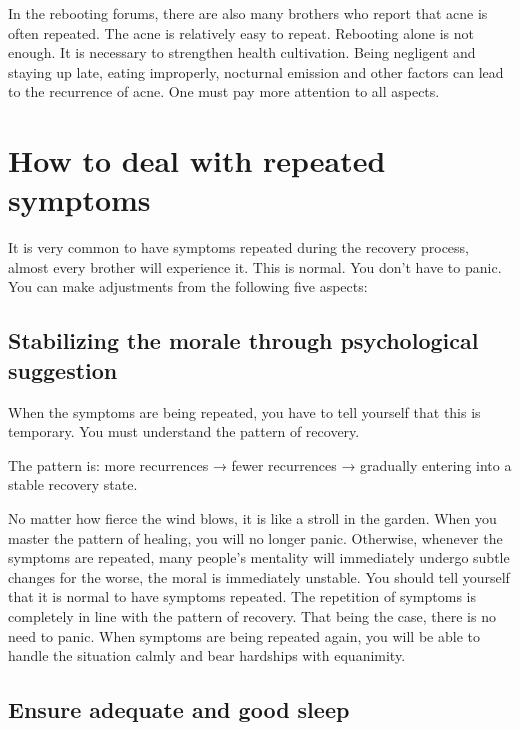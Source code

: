 \documentclass[
]{book}
\begin{document}
In the rebooting forums, there are also many brothers who report that acne is often repeated. The acne is relatively easy to repeat. Rebooting alone is not enough. It is necessary to strengthen health cultivation. Being negligent and staying up late, eating improperly, nocturnal emission and other factors can lead to the recurrence of acne. One must pay more attention to all aspects.

\hypertarget{how-to-deal-with-repeated-symptoms}{%
\section{How to deal with repeated symptoms}\label{how-to-deal-with-repeated-symptoms}}

It is very common to have symptoms repeated during the recovery process, almost every brother will experience it. This is normal. You don't have to panic. You can make adjustments from the following five aspects:

\hypertarget{stabilizing-the-morale-through-psychological-suggestion}{%
\subsection{Stabilizing the morale through psychological suggestion}\label{stabilizing-the-morale-through-psychological-suggestion}}

When the symptoms are being repeated, you have to tell yourself that this is temporary. You must understand the pattern of recovery.

The pattern is: more recurrences → fewer recurrences → gradually entering into a stable recovery state.

No matter how fierce the wind blows, it is like a stroll in the garden. When you master the pattern of healing, you will no longer panic. Otherwise, whenever the symptoms are repeated, many people's mentality will immediately undergo subtle changes for the worse, the moral is immediately unstable. You should tell yourself that it is normal to have symptoms repeated. The repetition of symptoms is completely in line with the pattern of recovery. That being the case, there is no need to panic. When symptoms are being repeated again, you will be able to handle the situation calmly and bear hardships with equanimity.

\hypertarget{ensure-adequate-and-good-sleep}{%
\subsection{Ensure adequate and good sleep}\label{ensure-adequate-and-good-sleep}}
\end{document}
